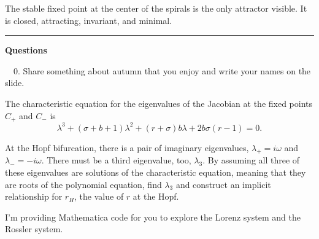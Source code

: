 \documentclass[12pt,letterpaper,noanswers]{exam}
\begin{document}
The stable fixed point at the center of the spirals is the only attractor visible.  It is closed, attracting, invariant, and minimal.

\vspace{0.2cm}

\hrule
\vspace{0.2cm}
\noindent\textbf{Questions}

\noindent \ \ 0.  Share something about autumn that you enjoy and write your names on the slide.

\begin{questions}





\question The characteristic equation for the eigenvalues of the Jacobian at the fixed points $C_+$ and $C_-$ is
\[\lambda^3 + (\sigma + b + 1)\lambda^2 + (r+\sigma) b \lambda + 2 b \sigma (r-1) = 0.\]

At the Hopf bifurcation, there is a pair of imaginary eigenvalues, $\lambda_+ = i\omega$ and $\lambda_- = -i\omega$.
There must be a third eigenvalue, too, $\lambda_3$.  By assuming all three of these eigenvalues are solutions of the characteristic equation, meaning that they
are roots of the polynomial equation, find $\lambda_3$ and construct an implicit relationship for $r_H$, the value of $r$ at the Hopf.


\item I'm providing Mathematica code for you to explore the Lorenz system and the Rossler system.

\end{questions}
\end{document}
